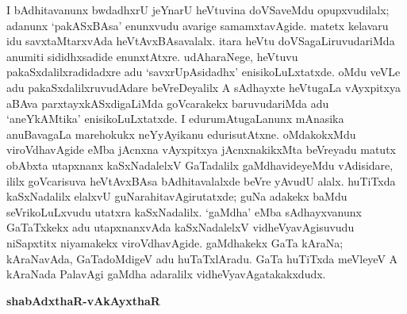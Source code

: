 I bAdhitavanunx bwdadhxrU jeYnarU heVtuvina doVSaveMdu opupxvudilalx; adanunx `pakASxBAsa' enunxvudu avarige samamxtavAgide. matetx kelavaru idu savxtaMtarxvAda heVtAvxBAsavalalx. itara heVtu doVSagaLiruvudariMda anumiti sididhxsadide enunxtAtxre. udAharaNege, heVtuvu pakaSxdalilxradidadxre adu `savxrUpAsidadhx' enisikoLuLxtatxde. oMdu veVLe adu pakaSxdalilxruvudAdare beVreDeyalilx A sAdhayxte heVtugaLa vAyxpitxya aBAva parxtayxkASxdigaLiMda goVcarakekx baruvudariMda adu `aneYkAMtika' enisikoLuLxtatxde. I edurumAtugaLanunx mAnasika anuBavagaLa marehokukx neYyAyikanu edurisutAtxne. oMdakokxMdu viroVdhavAgide eMba jAcnxna vAyxpitxya jAcnxnakikxMta beVreyadu matutx obAbxta utapxnanx kaSxNadalelxV GaTadalilx gaMdhavideyeMdu vAdisidare, ililx goVcarisuva heVtAvxBAsa bAdhitavalalxde beVre yAvudU alalx. huTiTxda kaSxNadalilx elalxvU guNarahitavAgirutatxde; guNa adakekx baMdu seVrikoLuLxvudu utatxra kaSxNadalilx. `gaMdha' eMba sAdhayxvanunx GaTaTxkekx adu utapxnanxvAda kaSxNadalelxV vidheVyavAgisuvudu niSapxtitx niyamakekx viroVdhavAgide. gaMdhakekx GaTa kAraNa; kAraNavAda, GaTadoMdigeV adu huTaTxlAradu. GaTa huTiTxda meVleyeV A kAraNada PalavAgi gaMdha adaralilx vidheVyavAgatakakxdudx.

\smallskip
\begin{center}
{\Large\bf shabAdxthaR-vAkAyxthaR}
\end{center}

